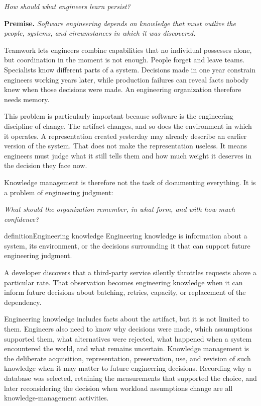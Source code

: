 \emph{How should what engineers learn persist?}

\textbf{Premise.} \emph{Software engineering depends on knowledge that must outlive the people, systems, and
circumstances in which it was discovered.}

Teamwork lets engineers combine capabilities that no individual possesses alone, but coordination in
the moment is not enough. People forget and leave teams. Specialists know different parts of a
system. Decisions made in one year constrain engineers working years later, while production
failures can reveal facts nobody knew when those decisions were made. An engineering organization
therefore needs memory.

This problem is particularly important because software is the engineering discipline of change. The
artifact changes, and so does the environment in which it operates. A representation created
yesterday may already describe an earlier version of the system. That does not make the
representation useless. It means engineers must judge what it still tells them and how much weight
it deserves in the decision they face now.

Knowledge management is therefore not the task of documenting everything. It is a problem of
engineering judgment:

\emph{What should the organization remember, in what form, and with how much confidence?}

\begin{bookbox}{definition}{Engineering knowledge} %
Engineering knowledge is information about a system, its environment, or the decisions surrounding
it that can support future engineering judgment.

A developer discovers that a third-party service silently throttles requests above a particular
rate. That observation becomes engineering knowledge when it can inform future decisions about
batching, retries, capacity, or replacement of the dependency.
\end{bookbox}

Engineering knowledge includes facts about the artifact, but it is not limited to them. Engineers
also need to know why decisions were made, which assumptions supported them, what alternatives were
rejected, what happened when a system encountered the world, and what remains uncertain. Knowledge
management is the deliberate acquisition, representation, preservation, use, and revision of such
knowledge when it may matter to future engineering decisions. Recording why a database was selected,
retaining the measurements that supported the choice, and later reconsidering the decision when
workload assumptions change are all knowledge-management activities.

